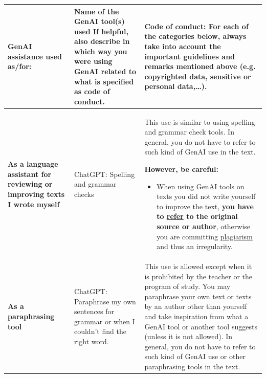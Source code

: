 \begin{longtable}{|p{}|p{}|p{}|}
\hline 
\textbf{GenAI assistance used as/for:} & \textbf{Name of the GenAI tool(s) used} If helpful, also describe in which way you were using GenAI related to what is specified as code of conduct. & \textbf{Code of conduct: \newline
For each of the categories below, always take into account the important guidelines and remarks mentioned above (e.g. copyrighted data, sensitive or personal data,…).} \\ \hline
\endfirsthead


\hline
\endfoot

\hline
\endlastfoot

\textbf{As a language assistant for reviewing or improving texts I wrote myself} & ChatGPT: Spelling and grammar checks & This use is similar to using spelling and grammar check tools. In general, you do not have to refer to such kind of GenAI use in the text. 

\textbf{However, be careful: }
\begin{itemize}
    \item When using GenAI tools on texts you did not write yourself to improve the text, \textbf{you have to \href{https://bib.kuleuven.be/english/training-and-tutorials/citation}{refer} to the original source or author}, otherwise you are committing \href{https://www.kuleuven.be/english/education/plagiarism/index}{plagiarism} and thus an irregularity.
\end{itemize} \\ \hline
\textbf{As a paraphrasing tool} & ChatGPT: Paraphrase my own sentences for grammar or when I couldn't find the right word. & This use is allowed except when it is prohibited by the teacher or the program of study. You may paraphrase your own text or texts by an author other than yourself and take inspiration from what a GenAI tool or another tool suggests (unless it is not allowed). In general, you do not have to refer to such kind of GenAI use or other paraphrasing tools in the text. 


\end{longtable}
